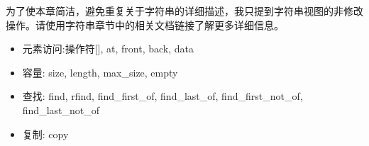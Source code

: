 为了使本章简洁，避免重复关于字符串的详细描述，我只提到字符串视图的非修改操作。请使用字符串章节中的相关文档链接了解更多详细信息。

\begin{itemize}
\item 
元素访问:操作符[], at, front, back, data

\item
容量: size, length, max\_size, empty 

\item
查找: find, rfind, find\_first\_of, find\_last\_of, find\_first\_not\_of, find\_last\_not\_of

\item
复制: copy 
\end{itemize}

















